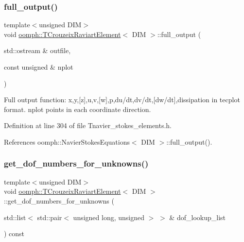 \subsubsection{\texorpdfstring{full\+\_\+output()}{full\_output()}\hspace{0.1cm}{\footnotesize\ttfamily [2/2]}}
{\footnotesize\ttfamily template$<$unsigned D\+IM$>$ \\
void \hyperlink{classoomph_1_1TCrouzeixRaviartElement}{oomph\+::\+T\+Crouzeix\+Raviart\+Element}$<$ D\+IM $>$\+::full\+\_\+output (\begin{DoxyParamCaption}\item[{std\+::ostream \&}]{outfile,  }\item[{const unsigned \&}]{nplot }\end{DoxyParamCaption})\hspace{0.3cm}{\ttfamily [inline]}}



Full output function\+: x,y,\mbox{[}z\mbox{]},u,v,\mbox{[}w\mbox{]},p,du/dt,dv/dt,\mbox{[}dw/dt\mbox{]},dissipation in tecplot format. nplot points in each coordinate direction. 



Definition at line 304 of file Tnavier\+\_\+stokes\+\_\+elements.\+h.



References oomph\+::\+Navier\+Stokes\+Equations$<$ D\+I\+M $>$\+::full\+\_\+output().

\mbox{\label{classoomph_1_1TCrouzeixRaviartElement_a517601fb2fa71851b6d2a84a1fb45ce8}} 
\subsubsection{\texorpdfstring{get\+\_\+dof\+\_\+numbers\+\_\+for\+\_\+unknowns()}{get\_dof\_numbers\_for\_unknowns()}}
{\footnotesize\ttfamily template$<$unsigned D\+IM$>$ \\
void \hyperlink{classoomph_1_1TCrouzeixRaviartElement}{oomph\+::\+T\+Crouzeix\+Raviart\+Element}$<$ D\+IM $>$\+::get\+\_\+dof\+\_\+numbers\+\_\+for\+\_\+unknowns (\begin{DoxyParamCaption}\item[{std\+::list$<$ std\+::pair$<$ unsigned long, unsigned $>$ $>$ \&}]{dof\+\_\+lookup\+\_\+list }\end{DoxyParamCaption}) const\hspace{0.3cm}{\ttfamily [virtual]}}



